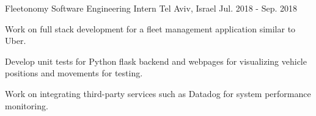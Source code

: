 \begin{cventries}
  \cventry
    {Fleetonomy} %
    {Software Engineering Intern} %
    {Tel Aviv, Israel} %
    {Jul. 2018 - Sep. 2018} %
    {
      \begin{cvitems} %
        \item {Work on full stack development for a fleet management application similar to Uber.}
        \item {Develop unit tests for Python flask backend and webpages for visualizing vehicle positions and movements for testing.}
        \item {Work on integrating third-party services such as Datadog for system performance monitoring.}
      \end{cvitems}
    }
    
\end{cventries}
